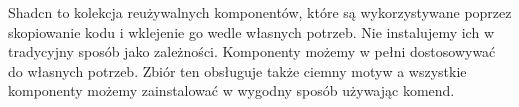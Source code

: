 Shadcn to kolekcja reużywalnych komponentów, które są wykorzystywane poprzez skopiowanie kodu i wklejenie go wedle własnych potrzeb. Nie instalujemy ich w tradycyjny sposób jako zależności. Komponenty możemy w pełni dostosowywać do własnych potrzeb. Zbiór ten obsługuje także ciemny motyw a wszystkie komponenty możemy zainstalować w wygodny sposób używając komend. \autocite{shadcn}